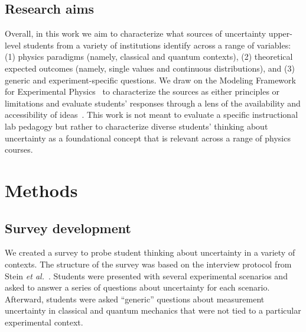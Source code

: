 \documentclass[english,aps,prstper,reprint,showpacs,longbibliography,superscriptaddress,nofootinbib]{revtex4-2}
\begin{document}
\subsection{Research aims}

Overall, in this work we aim to characterize what sources of uncertainty upper-level students from a variety of institutions identify across a range of variables: (1) physics paradigms (namely, classical and quantum contexts), (2) theoretical expected outcomes (namely, single values and continuous distributions), and (3) generic and experiment-specific questions. We draw on the Modeling Framework for Experimental Physics~\cite{DounasFrazer2018,Zwickl2015} to characterize the sources as either principles or limitations and evaluate students' responses through a lens of the availability and accessibility of ideas~\cite{Heckler2018}. This work is not meant to evaluate a specific instructional lab pedagogy but rather to characterize diverse students' thinking about uncertainty as a foundational concept that is relevant across a range of physics courses.

\section{Methods}


\subsection{Survey development}
\label{sec:survey}

We created a survey to probe student thinking about uncertainty in a variety of contexts. The structure of the survey was based on the interview protocol from Stein \textit{et al.}~\cite{Stein2019}. Students were presented with several experimental scenarios and asked to answer a series of questions about uncertainty for each scenario. Afterward, students were asked ``generic'' questions about measurement uncertainty in classical and quantum mechanics that were not tied to a particular experimental context. 
\end{document}
